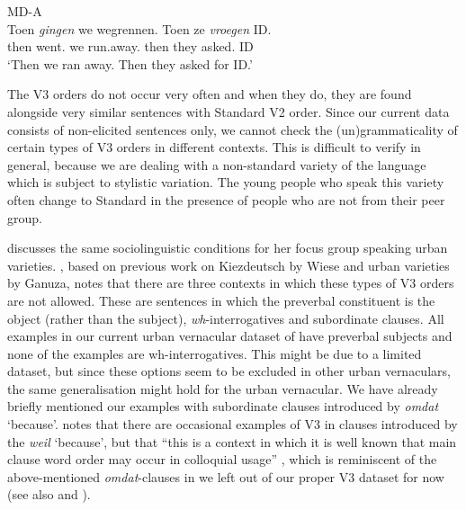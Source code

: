 \documentclass[output=paper]{langsci/langscibook}
\begin{document}
\ea\label{exdisV3} MD-A\\
    \gll Toen \textit{gingen} we wegrennen. Toen ze \textit{vroegen} ID.\\
    then went.\Pl{} we run.away.\Inf{} then they asked.\Pl{} ID\\
    \trans \enquote*{Then we ran away. Then they asked for ID.}
\z

\noindent The V3 orders do not occur very often and when they do, they are
found alongside very similar sentences with Standard  V2 order. Since our
current data consists of non-elicited sentences only, we cannot check the
(un)grammaticality of certain types of V3 orders in different contexts. This is
difficult to verify in general, because we are dealing with a non-standard
variety of the language which is subject to stylistic variation. The young
people who speak this variety often change to Standard  in the presence of
people who are not from their peer group.

\citet[109--130]{Ganuza:2008} discusses the same sociolinguistic conditions for
her focus group speaking  urban varieties. \citet{Walkden:2017}, based on
previous work on Kiezdeutsch by Wiese and  urban varieties by Ganuza,
notes that there are three contexts in which these types of V3 orders are not
allowed. These are sentences in which the preverbal constituent is the object
(rather than the subject), \emph{wh}-interrogatives and subordinate clauses.
All examples in our current urban vernacular dataset of  have preverbal
subjects and none of the examples are wh-interrogatives. This might be due to a
limited dataset, but since these options seem to be excluded in other urban
vernaculars, the same generalisation might hold for the  urban vernacular.
We have already briefly mentioned our examples with subordinate clauses
introduced by \emph{omdat} `because'. \citet{Walkden:2017} notes that there are
occasional examples of V3 in clauses introduced by the  \emph{weil}
`because', but that \enquote{this is a context in which it is well known that
main clause word order may occur in colloquial usage} \citep{Walkden:2017},
which is reminiscent of the above-mentioned \emph{omdat}-clauses in  we
left out of our proper V3 dataset for now (see also
\citealt{AntomoSteinbach:2010} and \citealt{Reis:2013}).

\end{document}
